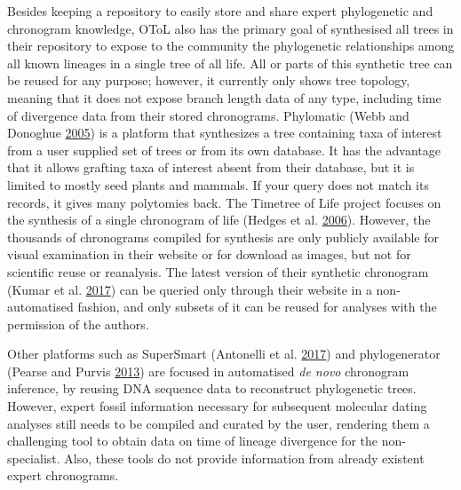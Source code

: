 \documentclass[]{article}
\begin{document}
Besides keeping a repository to easily store and share expert phylogenetic and chronogram knowledge, OToL also has the primary goal of synthesised all trees in their repository to expose to the community the phylogenetic relationships among all known lineages in a single tree of all life.
All or parts of this synthetic tree can be reused for any purpose; however, it currently only shows tree topology, meaning that it does not expose branch length data of any type, including time of divergence data from their stored chronograms.
Phylomatic (Webb and Donoghue \protect\hyperlink{ref-webb2005phylomatic}{2005})
is a platform that synthesizes a tree containing taxa of interest from a user supplied set of trees or from its own database.
It has the advantage that it allows grafting taxa of interest absent from their database, but it is limited to mostly seed plants and mammals. If your query does not match its records, it gives many polytomies back.
The Timetree of Life project focuses on the synthesis of a single chronogram of life (Hedges et al. \protect\hyperlink{ref-Hedges2006}{2006}). However, the thousands of chronograms compiled for synthesis are only publicly available for visual examination in their website or for download as images, but not for scientific reuse or reanalysis. The latest version of their synthetic chronogram (Kumar et al. \protect\hyperlink{ref-Kumar2017}{2017}) can be queried only through their website in a non-automatised fashion, and only subsets of it can be reused for analyses with the permission of the authors.

Other platforms such as SuperSmart (Antonelli et al. \protect\hyperlink{ref-antonelli2017supersmart}{2017}) and phylogenerator (Pearse and Purvis \protect\hyperlink{ref-pearse2013phylogenerator}{2013}) are focused in automatised \emph{de novo} chronogram inference, by reusing DNA sequence data to reconstruct phylogenetic trees. However, expert fossil information necessary for subsequent molecular dating analyses still needs to be compiled and curated by the user, rendering them a challenging tool to obtain data on time of lineage divergence for the non-specialist. Also, these tools do not provide information from already existent expert chronograms.
\end{document}
